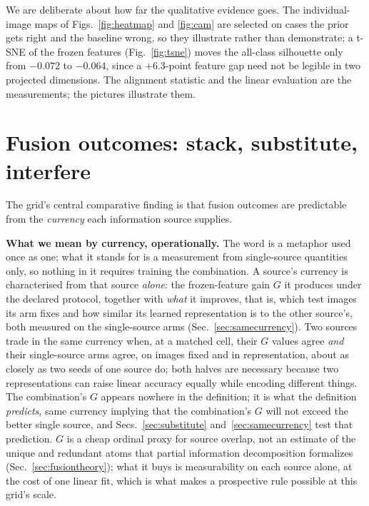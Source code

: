 We are deliberate about how far the qualitative evidence goes. The
individual-image maps of Figs.~\ref{fig:heatmap} and \ref{fig:cam} are
selected on cases the prior gets right
and the baseline wrong, so they illustrate rather than demonstrate; a t-SNE
of the frozen features (Fig.~\ref{fig:tsne}) moves the all-class silhouette
only from $-0.072$ to $-0.064$, since a $+6.3$-point feature gap need not be
legible in two projected dimensions. The alignment statistic and the linear
evaluation are the measurements; the pictures illustrate them.

\section{Fusion outcomes: stack, substitute, interfere}\label{sec:fusion}

The grid's central comparative finding is that fusion outcomes are predictable
from the \emph{currency} each information source supplies.

\textbf{What we mean by currency, operationally.} The word is a metaphor
used once as one; what it stands for is a measurement from single-source
quantities only, so nothing in it requires training the combination. A
source's currency is characterised from that source \emph{alone}: the
frozen-feature gain $G$ it produces under the declared protocol, together
with \emph{what} it improves, that is, which test images its arm fixes and
how similar its learned representation is to the other source's, both
measured on the single-source arms (Sec.~\ref{sec:samecurrency}). Two
sources trade in the same currency when, at a matched cell, their $G$ values
agree \emph{and} their single-source arms agree, on images fixed and in
representation, about as closely as two seeds of one source do; both halves
are necessary because two representations can raise linear accuracy equally
while encoding different things. The combination's $G$ appears nowhere in
the definition; it is what the definition \emph{predicts}, same currency
implying that the combination's $G$ will not exceed the better single
source, and Secs.~\ref{sec:substitute} and~\ref{sec:samecurrency} test
that prediction. $G$ is a cheap ordinal proxy for source overlap, not an
estimate of the unique and redundant atoms that partial information
decomposition formalizes (Sec.~\ref{sec:fusiontheory}); what it buys is
measurability on each source alone, at the cost of one linear fit, which is
what makes a prospective rule possible at this grid's scale.

